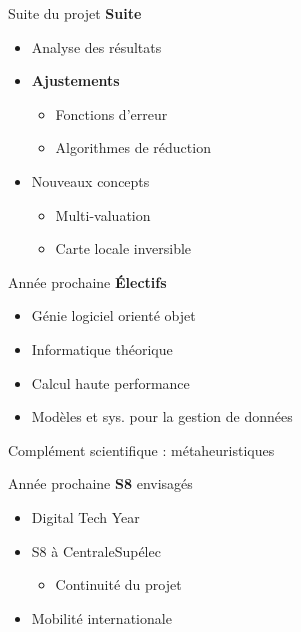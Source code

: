 \documentclass[french, 12pt]{beamer}
\begin{document}
\begin{frame}{Suite du projet}
\textbf{Suite}
\begin{itemize}
    \item Analyse des résultats
    \item \textbf{Ajustements}
    \begin{itemize}
        \item Fonctions d'erreur
        \item Algorithmes de réduction
    \end{itemize}
    \item Nouveaux concepts
    \begin{itemize}
        \item Multi-valuation
        \item Carte locale inversible
    \end{itemize}
\end{itemize}
\end{frame}

\begin{frame}{Année prochaine}
\textbf{Électifs} %
\begin{itemize}
    \item \small{Génie logiciel orienté objet}
    \item \small{Informatique théorique}
    \item \small{Calcul haute performance}
    \item \small{Modèles et sys. pour la gestion de données}
\end{itemize}
\vspace{1em}
Complément scientifique : métaheuristiques
\end{frame}

\begin{frame}{Année prochaine}
\textbf{S8} envisagés
\begin{itemize}
    \item Digital Tech Year
    \item S8 à CentraleSupélec
    \begin{itemize}
        \item Continuité du projet
    \end{itemize}
    \item Mobilité internationale
\end{itemize}
\end{frame}
\end{document}
